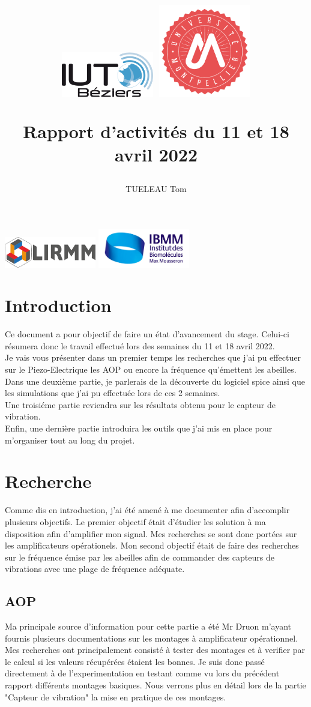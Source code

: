 \documentclass[11pt,french,a4paper]{article}
\title{
 \centering
         \includegraphics[width=4cm]{../../../logo/IUTlogo.png}  \hspace{7cm}
         \includegraphics[width=4cm]{../../../logo/UMlogo.png}  \hspace{7cm}
    
	\LARGE{Rapport d'activités du 11 et 18 avril 2022}
	\author{TUELEAU Tom}
}
\author{
	\date{}
}
\begin{document}
\maketitle
	 \includegraphics[width=4cm]{../../../logo/LIRMMlogo.png}  \hspace{7cm}
         \includegraphics[width=4cm]{../../../logo/IBMMlogo.jpg}  \hspace{7cm}
\newpage
\tableofcontents
\newpage
\section{Introduction}
Ce document a pour objectif de faire un état d'avancement du stage. Celui-ci résumera donc le travail effectué lors des semaines du 11 et 18 avril 2022.
\\Je vais vous présenter dans un premier temps les recherches que j'ai pu effectuer sur le Piezo-Electrique les AOP ou encore la fréquence qu'émettent les abeilles. 
\\Dans une deuxième partie, je parlerais de la découverte du logiciel spice ainsi que les simulations que j'ai pu effectuée lors de ces 2 semaines.
\\Une troisiéme partie reviendra sur les résultats obtenu pour le capteur de vibration. 
\\Enfin, une dernière partie introduira les outils que j'ai mis en place pour m'organiser tout au long du projet. 

\newpage
\section{Recherche}
Comme dis en introduction, j'ai été amené à me documenter afin d'accomplir plusieurs objectifs. Le premier objectif était d'étudier les solution à ma disposition afin d'amplifier mon signal. Mes recherches se sont donc portées sur les amplificateurs opérationels. Mon second objectif était de faire des recherches sur le fréquence émise par les abeilles afin de commander des capteurs de vibrations avec une plage de fréquence adéquate. 
\subsection{AOP}
Ma principale source d'information pour cette partie a été Mr Druon m'ayant fournis plusieurs documentations sur les montages à amplificateur opérationnel. 
Mes recherches ont principalement consisté à tester des montages et à verifier par le calcul si les valeurs récupérées étaient les bonnes.
Je suis donc passé directement à de l'experimentation en testant comme vu lors du précédent rapport différents montages basiques.
Nous verrons plus en détail lors de la partie "Capteur de vibration" la mise en pratique de ces montages.
\end{document}
